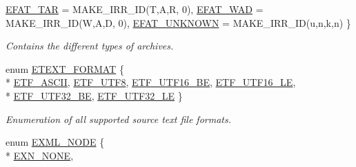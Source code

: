 \begin{DoxyCompactItemize}
\hyperlink{namespaceirr_1_1io_adb3e3c445ec8e608ed1f0f93306da14fa0f36ce25d47b45f41a58e32b4c029cb6}{E\+F\+A\+T\+\_\+\+T\+AR} = M\+A\+K\+E\+\_\+\+I\+R\+R\+\_\+\+ID(\textquotesingle{}T\textquotesingle{},\textquotesingle{}A\textquotesingle{},\textquotesingle{}R\textquotesingle{}, 0), 
\hyperlink{namespaceirr_1_1io_adb3e3c445ec8e608ed1f0f93306da14fa58895648160db47291c12b7ade47f68c}{E\+F\+A\+T\+\_\+\+W\+AD} = M\+A\+K\+E\+\_\+\+I\+R\+R\+\_\+\+ID(\textquotesingle{}W\textquotesingle{},\textquotesingle{}A\textquotesingle{},\textquotesingle{}D\textquotesingle{}, 0), 
\hyperlink{namespaceirr_1_1io_adb3e3c445ec8e608ed1f0f93306da14fa2c2aea9bc955ae4e0d29071ba66ff8dc}{E\+F\+A\+T\+\_\+\+U\+N\+K\+N\+O\+WN} = M\+A\+K\+E\+\_\+\+I\+R\+R\+\_\+\+ID(\textquotesingle{}u\textquotesingle{},\textquotesingle{}n\textquotesingle{},\textquotesingle{}k\textquotesingle{},\textquotesingle{}n\textquotesingle{})
 \}\begin{DoxyCompactList}\small\item\em Contains the different types of archives. \end{DoxyCompactList}
\item 
enum \hyperlink{namespaceirr_1_1io_ac7e51e5a6bd00451dec248f497b16a9d}{E\+T\+E\+X\+T\+\_\+\+F\+O\+R\+M\+AT} \{ \\*
\hyperlink{namespaceirr_1_1io_ac7e51e5a6bd00451dec248f497b16a9daa83b76584091bdef7401e2e7c27837bf}{E\+T\+F\+\_\+\+A\+S\+C\+II}, 
\hyperlink{namespaceirr_1_1io_ac7e51e5a6bd00451dec248f497b16a9dae9766ce8a50bc70e144a7b0cc96ba8db}{E\+T\+F\+\_\+\+U\+T\+F8}, 
\hyperlink{namespaceirr_1_1io_ac7e51e5a6bd00451dec248f497b16a9da5c0685f21f600ba0acdd84bae458ee5c}{E\+T\+F\+\_\+\+U\+T\+F16\+\_\+\+BE}, 
\hyperlink{namespaceirr_1_1io_ac7e51e5a6bd00451dec248f497b16a9da331a03a8d3459ad9a05d31dee38a8a73}{E\+T\+F\+\_\+\+U\+T\+F16\+\_\+\+LE}, 
\\*
\hyperlink{namespaceirr_1_1io_ac7e51e5a6bd00451dec248f497b16a9daa550dbb5ed61125ff6a12a9a50e4e7b1}{E\+T\+F\+\_\+\+U\+T\+F32\+\_\+\+BE}, 
\hyperlink{namespaceirr_1_1io_ac7e51e5a6bd00451dec248f497b16a9da122cd8cec108b4e5a4040f1a9bcc6709}{E\+T\+F\+\_\+\+U\+T\+F32\+\_\+\+LE}
 \}\begin{DoxyCompactList}\small\item\em Enumeration of all supported source text file formats. \end{DoxyCompactList}
\item 
enum \hyperlink{namespaceirr_1_1io_a86a02676c9cbb822e04d60c81b4f33ed}{E\+X\+M\+L\+\_\+\+N\+O\+DE} \{ \\*
\hyperlink{namespaceirr_1_1io_a86a02676c9cbb822e04d60c81b4f33edaa7f8e643a481d9c8b75a25499f40235c}{E\+X\+N\+\_\+\+N\+O\+NE}, 

\end{DoxyCompactItemize}
